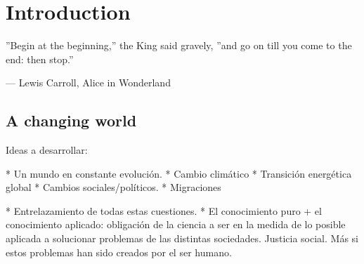 

\chapter{Introduction}

\epigraphfontsize{\small\itshape}
\epigraph{''Begin at the beginning,'' the King said gravely, ''and go on till you
come to the end: then stop.''}{--- \textup{Lewis Carroll}, Alice in Wonderland}

\section{A changing world} 

Ideas a desarrollar:

* Un mundo en constante evolución.
* Cambio climático
* Transición energética global
* Cambios sociales/políticos.
* Migraciones

* Entrelazamiento de todas estas cuestiones.
* El conocimiento puro + el conocimiento aplicado: obligación de la ciencia a ser en la medida de lo posible aplicada a solucionar problemas de las distintas sociedades. Justicia social. Más si estos problemas han sido creados por el ser humano.




